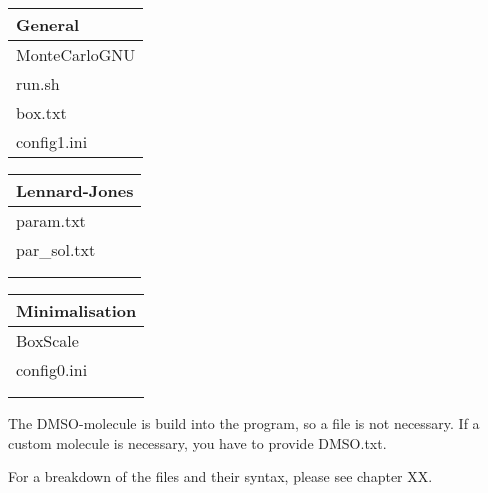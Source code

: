 \begin{tabular}{l}
	General \\ \hline
	MonteCarloGNU \\
	run.sh \\
	box.txt \\
	config1.ini \\
\end{tabular}
\hspace{0.5cm}
\begin{tabular}{l}
	Lennard-Jones \\ \hline
	param.txt \\
	par\_sol.txt \\
	\null \\
	\null \\
\end{tabular}
\hspace{0.5cm}
\begin{tabular}{l}
	Minimalisation \\ \hline
	BoxScale \\
	config0.ini \\
	\null \\
	\null \\
\end{tabular}

The DMSO-molecule is build into the program, so a file is not necessary.
If a custom molecule is necessary, you have to provide DMSO.txt.

For a breakdown of the files and their syntax, please see chapter XX.